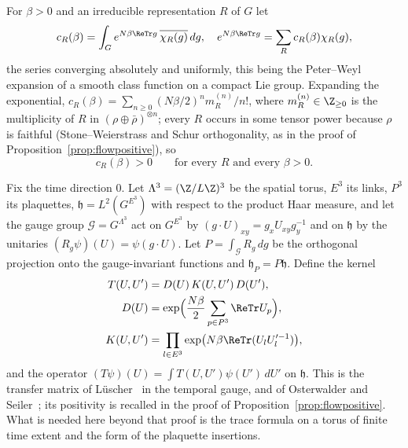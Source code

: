 For $\beta>0$ and an irreducible representation $R$ of $G$ let
\[
c_R(\beta)=\int_Ge^{N\beta\ReTr g}\,\overline{\chi_R(g)}\,dg,\quad
e^{N\beta\ReTr g}=\sum_Rc_R(\beta)\chi_R(g),
\]
the series converging absolutely and uniformly, this being
the Peter--Weyl expansion of a smooth class function on a compact Lie
group. Expanding the exponential, $c_R(\beta)=\sum_{n\ge0}(N\beta/2)^n
m^{(n)}_R/n!$, where $m^{(n)}_R\in\Z_{\ge0}$ is the multiplicity of $R$ in
$(\rho\oplus\bar\rho)^{\otimes n}$; every $R$ occurs in some tensor power
because $\rho$ is faithful (Stone--Weierstrass and Schur orthogonality, as
in the proof of Proposition~\ref{prop:flowpositive}), so
\begin{equation}\label{rEtwo:eqcpos}
c_R(\beta)>0\qquad\text{for every $R$ and every }\beta>0 .
\end{equation}

Fix the time direction $0$. Let $\Lambda^3=(\Z/L\Z)^3$ be the spatial
torus, $E^3$ its links, $P^3$ its plaquettes, $\mathfrak h=L^2(G^{E^3})$
with respect to the product Haar measure, and let the gauge group
$\mathcal G=G^{\Lambda^3}$ act on $G^{E^3}$ by $(g\cdot U)_{xy}=g_xU_{xy}
g_y^{-1}$ and on $\mathfrak h$ by the unitaries $(R_g\psi)(U)=\psi(g\cdot
U)$. Let $P=\int_{\mathcal G}R_g\,dg$ be the orthogonal projection onto
the gauge-invariant functions and $\mathfrak h_P=P\mathfrak h$. Define
the kernel
\begin{align*}
T(U,U')&=D(U)\,K(U,U')\,D(U'),\\
D(U)&=\exp\Bigl(\frac{N\beta}2\sum_{p\in P^3}\ReTr U_p\Bigr),\\
K(U,U')&=\prod_{l\in E^3}\exp\bigl(N\beta\ReTr(U_lU_l'^{-1})\bigr),
\end{align*}
and the operator $(T\psi)(U)=\int T(U,U')\psi(U')\,dU'$ on $\mathfrak h$.
This is the transfer matrix of L\"uscher~\cite{Lus77} in the temporal
gauge, and of Osterwalder and Seiler~\cite{OSei78}; its positivity is
recalled in the proof of Proposition~\ref{prop:flowpositive}. What is
needed here beyond that proof is the trace formula on a torus of finite
time extent and the form of the plaquette insertions.

